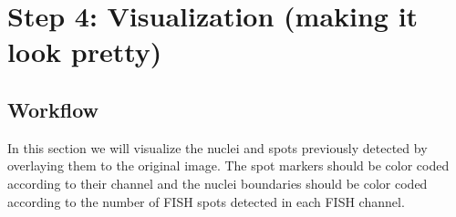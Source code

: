\section{Step 4: Visualization (making it look pretty)}

\subsection{Workflow}
In this section we will visualize the nuclei and spots previously detected by overlaying them to the original image. The spot markers should be color coded according to their channel and the nuclei boundaries should be color coded according to the number of FISH spots detected in each FISH channel.
